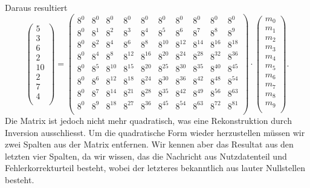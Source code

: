 Daraus resultiert
\[
\begin{pmatrix}
	5 \\ 3 \\ 6 \\ 2 \\ 10 \\ 2 \\ 7 \\ 4 \\
\end{pmatrix}
=
\begin{pmatrix}
	8^0&    8^0&    8^0&    8^0&    8^0&    8^0&    8^0&    8^0&    8^0&    8^0\\
	8^0&	8^1&	8^2&	8^3&	8^4&	8^5&	8^6&	8^7&    8^8&    8^9\\
	8^0&	8^2&	8^4&	8^6&	8^8& 8^{10}& 8^{12}& 8^{14}& 8^{16}& 8^{18}\\
	8^0&	8^4&	8^8& 8^{12}& 8^{16}& 8^{20}& 8^{24}& 8^{28}& 8^{32}& 8^{36}\\
	8^0&	8^5& 8^{10}& 8^{15}& 8^{20}& 8^{25}& 8^{30}& 8^{35}& 8^{40}& 8^{45}\\
	8^0&	8^6& 8^{12}& 8^{18}& 8^{24}& 8^{30}& 8^{36}& 8^{42}& 8^{48}& 8^{54}\\
	8^0&	8^7& 8^{14}& 8^{21}& 8^{28}& 8^{35}& 8^{42}& 8^{49}& 8^{56}& 8^{63}\\
	8^0&	8^9& 8^{18}& 8^{27}& 8^{36}& 8^{45}& 8^{54}& 8^{63}& 8^{72}& 8^{81}\\
\end{pmatrix}
\cdot
\begin{pmatrix}
	m_0 \\ m_1 \\ m_2 \\ m_3 \\ m_4 \\ m_5 \\ m_6 \\ m_7 \\ m_8 \\ m_9 \\
\end{pmatrix}
.
\]
Die Matrix ist jedoch nicht mehr quadratisch, was eine Rekonstruktion durch Inversion ausschliesst. 
Um die quadratische Form wieder herzustellen müssen wir zwei Spalten aus der Matrix entfernen.
Wir kennen aber das Resultat aus den letzten vier Spalten, da wir wissen, das die Nachricht aus Nutzdatenteil und Fehlerkorrekturteil besteht, wobei der letzteres bekanntlich aus lauter Nullstellen besteht.
